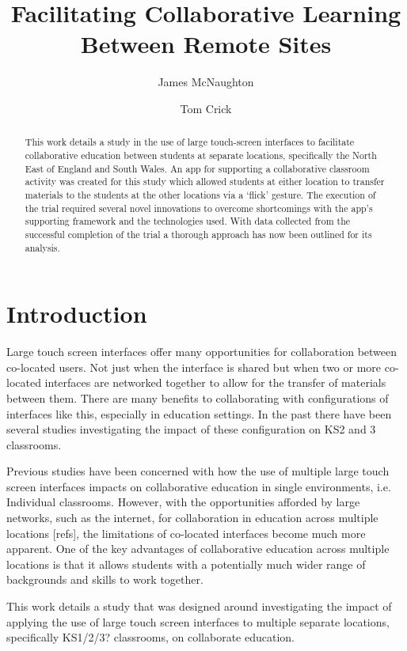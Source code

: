 \documentclass[a4paper,11pt]{article}
\title{Facilitating Collaborative Learning Between Remote Sites}
\author[1]{James McNaughton}
\author[2]{Tom Crick}
\affil[1]{School of Education, Durham University, UK} %
\affil[2]{Department of Computing \& Information Systems, Cardiff
  Metropolitan University, UK}
\affil[1]{\protect\url{j.a.mcnaughton@durham.ac.uk}}
\affil[2]{\protect\url{tcrick@cardiffmet.ac.uk}}
\date{ }
\begin{document}
\maketitle


\begin{abstract}
This work details a study in the use of large touch-screen interfaces to facilitate collaborative education between students at separate locations, specifically the North East of England and South Wales.
An app for supporting a collaborative classroom activity was created for this study which allowed students at either location to transfer materials to the students at the other locations via a `flick' gesture.
The execution of the trial required several novel innovations to overcome shortcomings with the app's supporting framework and the technologies used.
With data collected from the successful completion of the trial a thorough approach has now been outlined for its analysis.
\end{abstract}

\section{Introduction}

Large touch screen interfaces offer many opportunities for collaboration between co-located users. %
Not just when the interface is shared but when two or more co-located interfaces are networked together to allow for the transfer of materials between them. %
There are many benefits to collaborating with configurations of interfaces like this, especially in education settings. %
In the past there have been several studies investigating the impact of these configuration on KS2 and 3 classrooms. %

Previous studies have been concerned with how the use of multiple large touch screen interfaces impacts on collaborative education in single environments, i.e. Individual classrooms. %
However, with the opportunities afforded by large networks, such as the internet, for collaboration in education across multiple locations [refs], the limitations of co-located interfaces become much more apparent.
One of the key advantages of collaborative education across multiple locations is that it allows students with a potentially much wider range of backgrounds and skills to work together. %

This work details a study that was designed around investigating the impact of applying the use of large touch screen interfaces to multiple separate locations, specifically KS1/2/3? classrooms, on collaborate education. %
\end{document}
